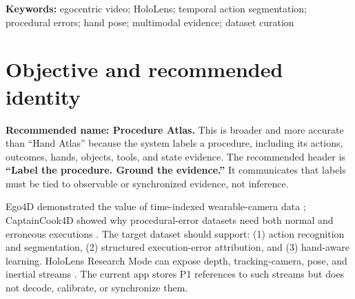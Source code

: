 \documentclass[10pt]{article}
\newcommand{\code}[1]{\texttt{\small #1}}
\begin{document}
\begin{abstract}
Egocentric HoloLens recordings can support procedural action segmentation,
execution-error recognition, and hand-aware learning only when raw media is
converted into synchronized, auditable supervision. Procedure Atlas implements
an always-on P0 contract comprising capture identity and split metadata,
versioned action taxonomies, structured mistake semantics,
presentation-timestamp-based intervals, reviewable MediaPipe hand keyframes,
portable projects, and semantic validation. Optional P1 labeling adds overlapping
object/tool interaction, contact, task state, recovery, task-graph, and HoloLens
sensor-reference evidence. P1 is disabled by default and may be excluded from
exports without deleting saved optional annotations. Screenshots use a
20-second proxy extracted from the supplied
\code{20260716\_012249\_HoloLens.mp4}; their labels are illustrative, not
adjudicated ground truth. This report defines the operating procedure, release
gates, and remaining limitations for producing training-ready data.
\end{abstract}

\textbf{Keywords:} egocentric video; HoloLens; temporal action segmentation;
procedural errors; hand pose; multimodal evidence; dataset curation

\section{Objective and recommended identity}

\textbf{Recommended name: Procedure Atlas.} This is broader and more accurate
than ``Hand Atlas'' because the system labels a procedure, including its actions,
outcomes, hands, objects, tools, and state evidence. The recommended header is
\textbf{``Label the procedure. Ground the evidence.''} It communicates that
labels must be tied to observable or synchronized evidence, not inference.

Ego4D demonstrated the value of time-indexed wearable-camera data
\cite{grauman2022ego4d}; CaptainCook4D showed why procedural-error datasets need
both normal and erroneous executions \cite{peddi2024captaincook4d}. The target
dataset should support: (1) action recognition and segmentation, (2) structured
execution-error attribution, and (3) hand-aware learning. HoloLens Research Mode
can expose depth, tracking-camera, pose, and inertial streams
\cite{microsoft_research_mode}. The current app stores P1 references to such
streams but does not decode, calibrate, or synchronize them.
\end{document}
